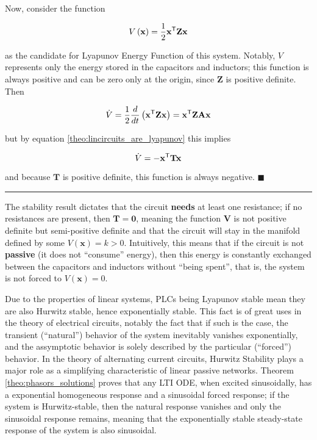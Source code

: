 	Now, consider the function

\begin{equation} V\left(\mathbf{x}\right) = \dfrac{1}{2}\mathbf{x}^{\mathsf{T}} \mathbf{Zx} \end{equation}

	\noindent as the candidate for Lyapunov Energy Function of this system. Notably, $V$ represents only the energy stored in the capacitors and inductors; this function is always positive and can be zero only at the origin, since $\mathbf{Z}$ is positive definite. Then

\begin{equation} \dot{V} = \dfrac{1}{2}\dfrac{d}{dt}\left(\mathbf{x}^{\mathsf{T}} \mathbf{Zx}\right) =  \mathbf{x}^{\mathsf{T}} \mathbf{ZAx}\end{equation}

	but by equation \eqref{theo:lincircuits_are_lyapunov} this implies

\begin{equation} \dot{V} = -\mathbf{x}^{\mathsf{T}}\mathbf{T}\mathbf{x} \end{equation}

	and because $\mathbf{T}$ is positive definite, this function is always negative.
\hfill$\blacksquare$
\vspace{5mm}
\hrule
\vspace{5mm}
\begin{remark} The stability result dictates that the circuit \textbf{needs} at least one resistance; if no resistances are present, then $\mathbf{T = 0}$, meaning the function $\mathbf{V}$ is not positive definite but semi-positive definite and that the circuit will stay in the manifold defined by some $V\left(\mathbf{x}\right) = k > 0$. Intuitively, this means that if the circuit is not \textbf{passive} (it does not ``consume'' energy), then this energy is constantly exchanged between the capacitors and inductors without ``being spent'', that is, the system is not forced to $V\left(\mathbf{x}\right) = 0$. \end{remark}

	Due to the properties of linear systems, PLCs being Lyapunov stable mean they are also Hurwitz stable, hence exponentially stable. This fact is of great uses in the theory of electrical circuits, notably the fact that if such is the case, the transient (``natural'') behavior of the system inevitably vanishes exponentially, and the assymptotic behavior is solely described by the particular (``forced'') behavior. In the theory of alternating current circuits, Hurwitz Stability plays a major role as a simplifying characteristic of linear passive networks. Theorem \ref{theo:phasors_solutions} proves that any LTI ODE, when excited sinusoidally, has a exponential homogeneous response and a sinusoidal forced response; if the system is Hurwitz-stable, then the natural response vanishes and only the sinusoidal response remains, meaning that the exponentially stable steady-state response of the system is also sinusoidal.

